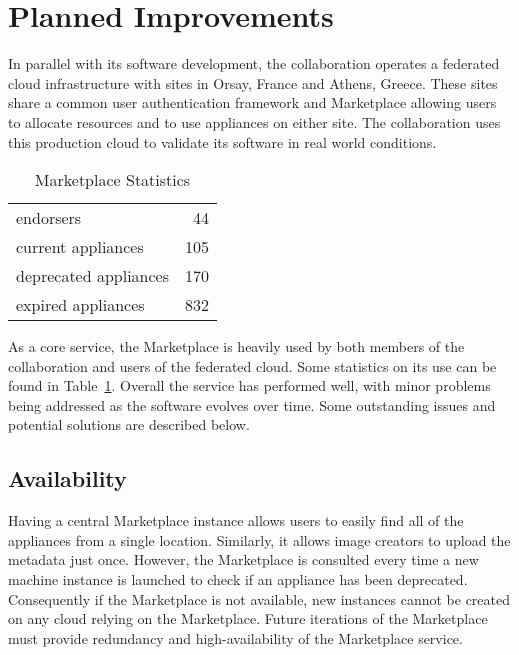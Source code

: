 \section{Planned Improvements}
\label{sec:production}

In parallel with its software development, the collaboration operates
a federated cloud infrastructure with sites in Orsay, France and
Athens, Greece\@.  These sites share a common user authentication
framework and Marketplace allowing users to allocate resources and to
use appliances on either site.  The collaboration uses this production
cloud to validate its software in real world conditions.

\begin{table}
\caption{Marketplace Statistics}
\label{tab:statistics}
\begin{center}
\begin{tabular}{lr}
\hline
\hline
endorsers & 44 \\
current appliances & 105 \\
deprecated appliances & 170 \\
expired appliances & 832 \\
\hline
\hline
\end{tabular}
\end{center}
\end{table}

As a core service, the Marketplace is heavily used by both members of
the collaboration and users of the federated cloud.  Some statistics
on its use can be found in Table~\ref{tab:statistics}.  Overall the
service has performed well, with minor problems being addressed as the
software evolves over time.  Some outstanding issues and potential
solutions are described below.

\subsection{Availability}

Having a central Marketplace instance allows users to easily find all
of the appliances from a single location.  Similarly, it allows image
creators to upload the metadata just once.  However, the Marketplace
is consulted every time a new machine instance is launched to check if
an appliance has been deprecated.  Consequently if the Marketplace is
not available, new instances cannot be created on any cloud relying on
the Marketplace\@.  Future iterations of the Marketplace must provide
redundancy and high-availability of the Marketplace service. 

